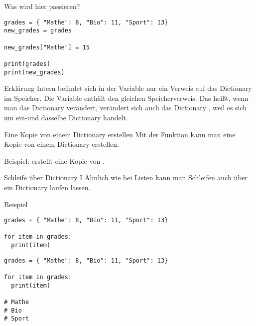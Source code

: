 \begin{fragile}
\begin{block}{Was wird hier passieren?}
\vspace{2pt}
\begin{verbatim}
grades = { "Mathe": 8, "Bio": 11, "Sport": 13}
new_grades = grades

new_grades["Mathe"] = 15

print(grades)
print(new_grades)
\end{verbatim}
\end{block}

\pause 
\vspace{12pt}

\begin{block}{Erklärung}
	\vspace{2pt}
Intern befindet sich in der Variable  nur ein Verweis auf das Dictionary im Speicher. Die Variable  enthält den gleichen Speicherverweis. Das heißt, wenn man das Dictionary  verändert, verändert sich auch das Dictionary , weil es sich um ein-und dasselbe Dictionary handelt. 
\end{block}


\end{fragile}

\begin{frame}
	\begin{block}{Eine Kopie von einem Dictionary erstellen}
		\vspace{2pt}
		Mit der Funktion  kann man eine Kopie von einem Dictionary erstellen. 
		
		Beispiel:  erstellt eine Kopie von .
	\end{block}
\end{frame}

\begin{fragile}
\begin{block}{Schleife über Dictionary I}
\vspace{2pt}
Ähnlich wie bei Listen kann man Schleifen auch über ein Dictionary laufen lassen.  
\end{block}
\vspace{12pt}
\pause 

\begin{exampleblock}{Beispiel}
\vspace{2pt}
\begin{overprint}
\begin{verbatim}
grades = { "Mathe": 8, "Bio": 11, "Sport": 13}

for item in grades:
  print(item)
\end{verbatim}
\begin{verbatim}
grades = { "Mathe": 8, "Bio": 11, "Sport": 13}

for item in grades:
  print(item)

# Mathe
# Bio
# Sport
\end{verbatim}
\end{overprint}
\end{exampleblock}
\end{fragile}

